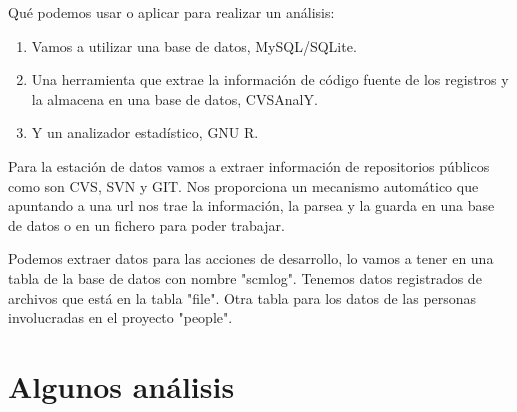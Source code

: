 Qu\'e podemos usar o aplicar para realizar un an\'alisis:
\begin{enumerate}
\item
Vamos a utilizar una base de datos, MySQL/SQLite.
\item
Una herramienta que extrae la informaci\'on de c\'odigo fuente de los registros y la almacena en una base de datos, CVSAnalY.
\item
Y un analizador estad\'istico, GNU R.
\end{enumerate}

Para la estaci\'on de datos vamos a extraer informaci\'on de repositorios p\'ublicos como son CVS, SVN y GIT. Nos proporciona un mecanismo autom\'atico que apuntando a una url nos trae la informaci\'on, la parsea y la guarda en una base de datos o en un fichero para poder trabajar.

Podemos extraer datos para las acciones de desarrollo, lo vamos a tener en una tabla de la base de datos con nombre "scmlog".
Tenemos datos registrados de archivos que est\'a en la tabla "file".
Otra tabla para los datos de las personas involucradas en el proyecto "people".

\section{Algunos an\'alisis}

